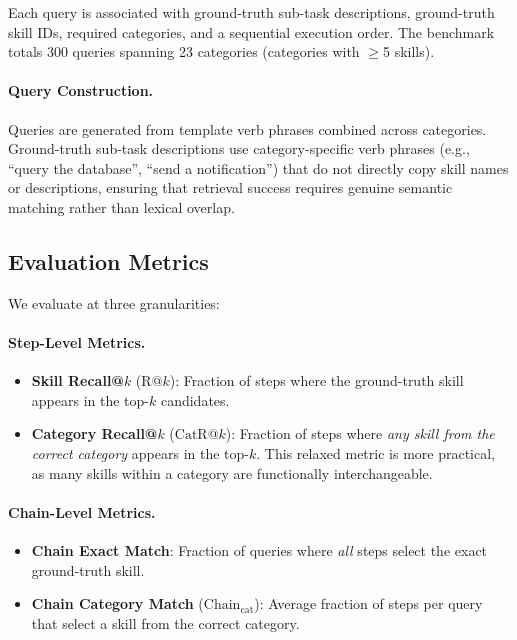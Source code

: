 \documentclass[11pt]{article}
\newcommand{\catrecall}{\text{CatR}}
\newcommand{\chaincat}{\text{Chain}_\text{cat}}
\begin{document}
Each query is associated with ground-truth sub-task descriptions, ground-truth skill IDs, required categories, and a sequential execution order.
The benchmark totals 300 queries spanning 23 categories (categories with $\geq$5 skills).

\paragraph{Query Construction.}
Queries are generated from template verb phrases combined across categories.
Ground-truth sub-task descriptions use category-specific verb phrases (e.g., ``query the database'', ``send a notification'') that do not directly copy skill names or descriptions, ensuring that retrieval success requires genuine semantic matching rather than lexical overlap.

\subsection{Evaluation Metrics}

We evaluate at three granularities:

\paragraph{Step-Level Metrics.}
\begin{itemize}[nosep,leftmargin=*]
  \item \textbf{Skill Recall@$k$} (R@$k$): Fraction of steps where the ground-truth skill appears in the top-$k$ candidates.
  \item \textbf{Category Recall@$k$} ($\catrecall$@$k$): Fraction of steps where \emph{any skill from the correct category} appears in the top-$k$.
  This relaxed metric is more practical, as many skills within a category are functionally interchangeable.
\end{itemize}

\paragraph{Chain-Level Metrics.}
\begin{itemize}[nosep,leftmargin=*]
  \item \textbf{Chain Exact Match}: Fraction of queries where \emph{all} steps select the exact ground-truth skill.
  \item \textbf{Chain Category Match} ($\chaincat$): Average fraction of steps per query that select a skill from the correct category.
\end{itemize}
\end{document}
